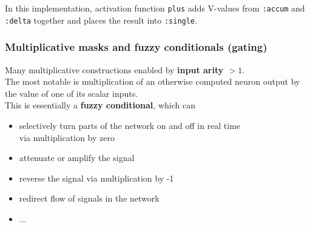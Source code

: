 \documentclass{beamer}
\newcommand{\msmagenta}[1]{{\color{mymagenta} #1}}
\newcommand{\msgreen}[1]{{\color{mygreen} #1}}
\begin{document}
\begin{frame}

In this implementation, activation function \msgreen{\footnotesize \tt plus} adds V-values from 
{\footnotesize\tt :accum} and {\footnotesize\tt :delta}
together and places the result into {\footnotesize\tt :single}.

\end{frame}

\begin{frame}

  \frametitle{Multiplicative masks and fuzzy conditionals (gating)}

\msmagenta{Many multiplicative constructions enabled by {\bf input arity $>1$}.}\\[2ex]

The most notable is multiplication of an otherwise computed
neuron output by the value of one of its scalar inputs.\\[2ex]

This is essentially a {\bf fuzzy conditional}, which can
\begin{itemize} 
\item selectively
turn parts of the network on and off in real time\\ via multiplication by zero
\item attenuate or amplify the signal
\item  reverse the signal
via multiplication by -1
\item  redirect
flow of signals in the network
\item ... \\[2ex]
\end{itemize}

\end{frame}
\end{document}
